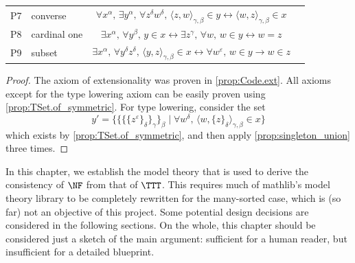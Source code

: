 \begin{theorem}
\begin{center}
\begin{tabular}{llcl}
      P7 & converse & \( \forall x^\alpha,\, \exists y^\alpha,\, \forall z^\delta w^\delta,\, \langle z, w \rangle_{\gamma,\beta} \in y \leftrightarrow \langle w, z \rangle_{\gamma,\beta} \in x \) \\
      P8 & cardinal one & \( \exists x^\alpha,\, \forall y^\beta,\, y \in x \leftrightarrow \exists z^\gamma,\, \forall w,\, w \in y \leftrightarrow w = z \) \\
      P9 & subset & \( \exists x^\alpha,\, \forall y^\delta z^\delta,\, \langle y, z \rangle_{\gamma,\beta} \in x \leftrightarrow \forall w^\varepsilon,\, w \in y \to w \in z \)
    \end{tabular}
  \end{center}
\end{theorem}
\begin{proof}
  The axiom of extensionality was proven in \cref{prop:Code.ext}.
  All axioms except for the type lowering axiom can be easily proven using \cref{prop:TSet.of_symmetric}.
  For type lowering, consider the set
  \[ y' = \{ \{\{\{z^\varepsilon\}_\delta\}_\gamma\}_\beta \mid \forall w^\delta,\, \langle w, \{ z \}_\delta \rangle_{\gamma,\beta} \in x \} \]
  which exists by \cref{prop:TSet.of_symmetric}, and then apply \cref{prop:singleton_union} three times.
\end{proof}


In this chapter, we establish the model theory that is used to derive the consistency of \( \NF \) from that of \( \TTT \).
This requires much of mathlib's model theory library to be completely rewritten for the many-sorted case, which is (so far) not an objective of this project.
Some potential design decisions are considered in the following sections.
On the whole, this chapter should be considered just a sketch of the main argument: sufficient for a human reader, but insufficient for a detailed blueprint.

